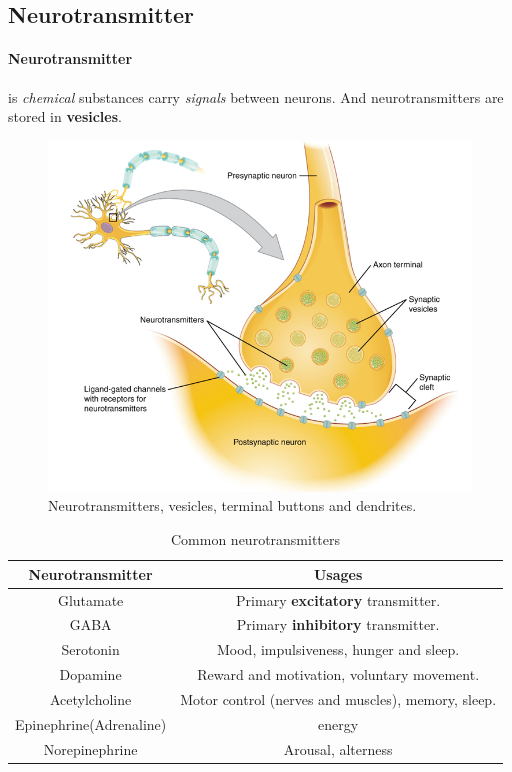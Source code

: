 \documentclass{article}
\begin{document}
	\subsection{Neurotransmitter}
	\paragraph{Neurotransmitter} is \emph{chemical} substances carry \emph{signals} between neurons. And neurotransmitters are stored in \textbf{vesicles}.
	\begin{figure}
		\includegraphics[width=\linewidth]{pic/transmitter}
		\caption{Neurotransmitters, vesicles, terminal buttons and dendrites.}
	\end{figure}
	\begin{table}
		\centering
		\begin{tabular}{|c|c|}
			\hline
			\textbf{Neurotransmitter} & \textbf{Usages} \\ \hline
			Glutamate & Primary \textbf{excitatory} transmitter.\\ \hline
			GABA & Primary \textbf{inhibitory} transmitter.\\ \hline
			Serotonin & Mood, impulsiveness, hunger and sleep.\\ \hline
			Dopamine & Reward and motivation, voluntary movement.\\ \hline
			Acetylcholine & Motor control (nerves and muscles), memory, sleep. \\ \hline
			Epinephrine(Adrenaline) & energy \\ \hline
			Norepinephrine & Arousal, alterness \\ \hline
		\end{tabular}
		\caption{Common neurotransmitters}
	\end{table}
\end{document}
